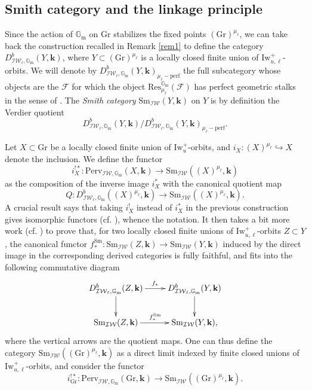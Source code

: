 \documentclass[11pt]{amsart}
\theoremstyle{plain}
\theoremstyle{remark}
\numberwithin{equation}{section}
\begin{document}
	\subsection{Smith category and the linkage principle}
	Since the action of $\mathbb{G}_\mathrm{m}$ on $\mathrm{Gr}$ stabilizes the fixed points $(\mathrm{Gr})^{\mu_\ell}$, we can take back the construction recalled in Remark \ref{rem1} to define the category $D^b_{\mathcal{IW}_\ell,\mathbb{G}_\mathrm{m}}(Y,\mathbf{k})$, where $Y\subset (\mathrm{Gr})^{\mu_\ell}$ is a locally closed finite union of $\mathrm{Iw}_{u,\ell}^+$-orbits. We will denote by $D^b_{\mathcal{IW}_\ell,\mathbb{G}_\mathrm{m}}(Y,\mathbf{k})_{\mu_\ell-\text{perf}}$ the full subcategory whose objects are the $\mathcal{F}$ for which the object $\mathrm{Res}^{\mathbb{G}_\mathrm{m}}_{\mu_\ell}(\mathcal{F})$ has perfect geometric stalks in the sense of \cite[§3.3]{riche2020smithtreumann}. The \textit{Smith category} $\mathrm{Sm}_{\mathcal{IW}}(Y,\mathbf{k})$ on $Y$ is by definition the Verdier quotient
	$$D^b_{\mathcal{IW}_\ell,\mathbb{G}_\mathrm{m}}(Y,\mathbf{k})/D^b_{\mathcal{IW}_\ell,\mathbb{G}_\mathrm{m}}(Y,\mathbf{k})_{\mu_\ell-\text{perf}}. $$ 
	
	Let $X\subset\mathrm{Gr}$ be a locally closed finite union of $\mathrm{Iw}_u^+$-orbits, and $i_X:(X)^{\mu_\ell}\hookrightarrow X$ denote the inclusion. We define the functor $$i_X^{!*}:\mathrm{Perv}_{\mathcal{IW},\mathbb{G}_\mathrm{m}}(X,\mathbf{k})\to \mathrm{Sm}_{\mathcal{IW}}((X)^{\mu_\ell},\mathbf{k})$$ as the composition of the inverse image $i_X^*$ with the canonical quotient map $$Q:D^b_{\mathcal{IW}_\ell,\mathbb{G}_\mathrm{m}}((X)^{\mu_\ell},\mathbf{k})\to \mathrm{Sm}_{\mathcal{IW}}((X)^{\mu_\ell},\mathbf{k}).$$ A crucial result says that taking $i_X^!$ instead of $i_X^*$ in the previous construction gives isomorphic functors (cf. \cite[§6.2]{riche2020smithtreumann}), whence the notation. It then takes a bit more work (cf. \cite[Lemma 6.1]{riche2020smithtreumann}) to prove that, for two locally closed finite unions of $\mathrm{Iw}_{u,\ell}^+$-orbits $Z\subset Y$, the canonical functor $f^{\mathrm{Sm}}_*:\mathrm{Sm}_{\mathcal{IW}}(Z,\mathbf{k})\to \mathrm{Sm}_{\mathcal{IW}}(Y,\mathbf{k})$ induced by the direct image in the corresponding derived categories is fully faithful, and fits into the following commutative diagram
	$$\xymatrix{
		D^b_{\mathcal{IW}_\ell,\mathbb{G}_\mathrm{m}}(Z,\mathbf{k})\ar[r]^{f_*} \ar[d] &  D^b_{\mathcal{IW}_\ell,\mathbb{G}_\mathrm{m}}(Y,\mathbf{k})  \ar[d] \\
		\mathrm{Sm}_{\mathcal{IW}}(Z,\mathbf{k}) \ar[r]^{f^{\mathrm{Sm}}_*} &  \mathrm{Sm}_{\mathcal{IW}}(Y,\mathbf{k}),
	}$$
	where the vertical arrows are the quotient maps. One can thus define the category $\mathrm{Sm}_{\mathcal{IW}}((\mathrm{Gr})^{\mu_\ell},\mathbf{k})$ as a direct limit indexed by finite closed unions of $\mathrm{Iw}_{u,\ell}^+$-orbits, and consider the functor
	$$i^{!*}_{\mathrm{Gr}}:\mathrm{Perv}_{\mathcal{IW},\mathbb{G}_\mathrm{m}}(\mathrm{Gr},\mathbf{k})\to \mathrm{Sm}_{\mathcal{IW}}((\mathrm{Gr})^{\mu_\ell},\mathbf{k}).$$
	
\end{document}

